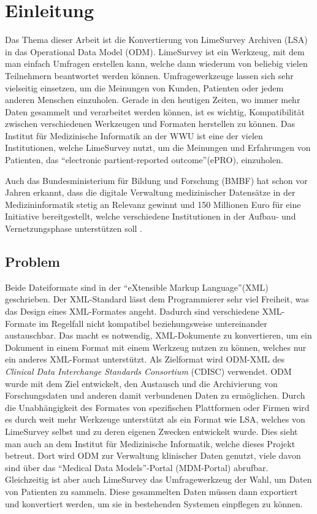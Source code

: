 \chapter{Einleitung}
\label{ch:einleitung}

Das Thema dieser Arbeit ist die Konvertierung von LimeSurvey Archiven (LSA) in das Operational Data Model (ODM).
LimeSurvey ist ein Werkzeug, mit dem man einfach Umfragen erstellen kann, welche dann wiederum von beliebig vielen Teilnehmern beantwortet werden können.
Umfragewerkzeuge lassen sich sehr vielseitig einsetzen, um die Meinungen von Kunden, Patienten oder jedem anderen Menschen einzuholen.
Gerade in den heutigen Zeiten, wo immer mehr Daten gesammelt und verarbeitet werden können, ist es wichtig, Kompatibilität zwischen verschiedenen Werkzeugen und Formaten herstellen zu können.
Das Institut für Medizinische Informatik an der WWU ist eine der vielen Institutionen, welche LimeSurvey nutzt, um die Meinungen und Erfahrungen von Patienten, das \enquote{electronic partient-reported outcome}(ePRO), einzuholen.

Auch das Bundesministerium für Bildung und Forschung (BMBF) hat schon vor Jahren erkannt, dass die digitale Verwaltung medizinischer Datensätze in der Medizininformatik stetig an Relevanz gewinnt und 150 Millionen Euro für eine Initiative bereitgestellt, welche verschiedene Institutionen in der Aufbau- und Vernetzungsphase unterstützen soll \cite{bmbf_medinfo}.

\section{Problem}
Beide Dateiformate sind in der \enquote{eXtensible Markup Language}(XML) geschrieben.
Der XML-Standard lässt dem Programmierer sehr viel Freiheit, was das Design eines XML-Formates angeht. Dadurch sind verschiedene XML-Formate im Regelfall nicht kompatibel beziehungsweise untereinander austauschbar.
Das macht es notwendig, XML-Dokumente zu konvertieren, um ein Dokument in einem Format mit einem Werkzeug nutzen zu können, welches nur ein anderes XML-Format unterstützt.
Als Zielformat wird ODM-XML des \textit{Clinical Data Interchange Standards Consortium} (CDISC) verwendet.
ODM wurde mit dem Ziel entwickelt, den Austausch und die Archivierung von Forschungsdaten und anderen damit verbundenen Daten zu ermöglichen.
Durch die Unabhängigkeit des Formates von spezifischen Plattformen oder Firmen wird es durch weit mehr Werkzeuge unterstützt als ein Format wie LSA, welches von LimeSurvey selbst und zu deren eigenen Zwecken entwickelt wurde.
Dies sieht man auch an dem Institut für Medizinische Informatik, welche dieses Projekt betreut.
Dort wird ODM zur Verwaltung klinischer Daten genutzt, viele davon sind über das \enquote{Medical Data Models}-Portal (MDM-Portal)\cite{mdm} abrufbar.
Gleichzeitig ist aber auch LimeSurvey das Umfragewerkzeug der Wahl, um Daten von Patienten zu sammeln.
Diese gesammelten Daten müssen dann exportiert und konvertiert werden, um sie in bestehenden Systemen einpflegen zu können.

